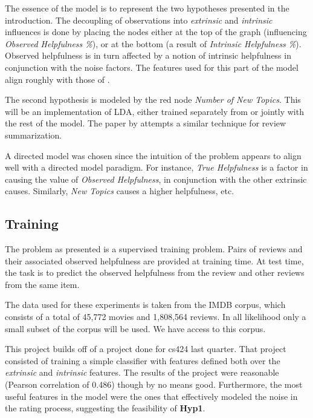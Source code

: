 \documentclass[12pt,letterpaper]{article}
\begin{document}
The essence of the model is to represent the two hypotheses presented in the
	introduction. 
The decoupling of observations into {\em extrinsic} and
	{\em intrinsic} influences is done by placing the nodes either at the top
	of the graph (influencing {\em Observed Helpfulness \%}), or at the bottom
	(a result of {\em Intrinsic Helpfulness \%}).
Observed helpfulness is in turn affected by a notion of intrinsic helpfulness
	in conjunction with the noise factors.
The features used for this part of the model align roughly with those of
	.

The second hypothesis is modeled by the red node {\em Number of New Topics}.
This will be an implementation of LDA, either trained separately from or
	jointly with the rest of the model.
The paper by  attempts a similar technique
	for review summarization.

A directed model was chosen since the intuition of the problem appears to
	align well with a directed model paradigm.
For instance, {\em True Helpfulness} is a factor in causing the value of
	{\em Observed Helpfulness}, in conjunction with the other extrinsic
	causes.
Similarly, {\em New Topics} causes a higher helpfulness, etc.

\subsection{Training}
The problem as presented is a supervised training problem.
Pairs of reviews and their associated observed helpfulness are provided at
	training time.
At test time, the task is to predict the observed helpfulness from the review
	and other reviews from the same item.

The data used for these experiments is taken from the IMDB corpus, which
	consists of a total of 45,772 movies and 1,808,564 reviews.
In all likelihood only a small subset of the corpus will be used.
We have access to this corpus.


This project builds off of a project done for cs424 last quarter.
That project consisted of training a simple classifier with features
	defined both over the {\em extrinsic} and {\em intrinsic} features.
The results of the project were reasonable (Pearson correlation of 0.486)
	though by no means good.
Furthermore, the most useful features in the model were the ones that
	effectively modeled the noise in the rating process, suggesting the
	feasibility of {\bf Hyp1}.
\end{document}
